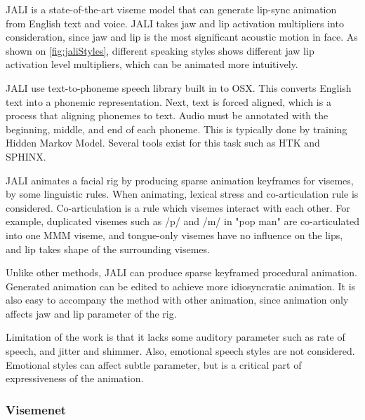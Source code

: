\documentclass[10pt,twocolumn,letterpaper]{article}
\begin{document}
JALI\cite{edwardsJALIAnimatorcentricViseme2016} is a state-of-the-art viseme model that can generate lip-sync animation from English text and voice. JALI takes jaw and lip activation multipliers into consideration, since jaw and lip is the most significant acoustic motion in face. As shown on \cref{fig:jaliStyles}, different speaking styles shows different jaw lip activation level multipliers, which can be animated more intuitively.

JALI use text-to-phoneme speech library built in to OSX. This converts English text into a phonemic representation. Next, text is forced aligned, which is a process that aligning phonemes to text. Audio must be annotated with the beginning, middle, and end of each phoneme. This is typically done by training Hidden Markov Model. Several tools exist for this task such as HTK and SPHINX.

JALI animates a facial rig by producing sparse animation keyframes for visemes, by some linguistic rules. When animating, lexical stress and co-articulation rule is considered. Co-articulation is a rule which visemes interact with each other. For example, duplicated visemes such as /p/ and /m/ in "pop man" are co-articulated into one MMM viseme, and tongue-only visemes have no influence on the lips, and lip takes shape of the surrounding visemes.


Unlike other methods, JALI can produce sparse keyframed procedural animation. Generated animation can be edited to achieve more idiosyncratic animation. It is also easy to accompany the method with other animation, since animation only affects jaw and lip parameter of the rig.

Limitation of the work is that it lacks some auditory parameter such as rate of speech, and jitter and shimmer. Also, emotional speech styles are not considered. Emotional styles can affect subtle parameter, but is a critical part of expressiveness of the animation.

\subsubsection{Visemenet}
\end{document}
